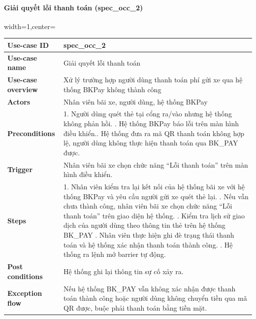 \paragraph{ Giải quyết lỗi thanh toán (spec\_occ\_2)}
\begin{adjustbox}{width=1\textwidth,center=\textwidth}
\small
\begin{tabular}{|>{\centering\arraybackslash}m{3.5cm}|m{13.2cm}|}
\hline
\textbf{Use-case ID} & spec\_occ\_2   \\ \hline
\textbf{Use-case name} & Giải quyết lỗi thanh toán   \\ \hline
\textbf{Use-case overview} & Xử lý trường hợp người dùng thanh toán phí gửi xe qua hệ thống BKPay không thành công   \\ \hline
\textbf{Actors} & Nhân viên bãi xe, người dùng, hệ thống BKPay  \\ \hline
\textbf{Preconditions} & 1. Người dùng quét thẻ tại cổng ra/vào nhưng hệ thống không phản hồi. \newline
2. Hệ thống BKPay báo lỗi trên màn hình điều khiển.\newline
3. Hệ thống đưa ra mã QR thanh toán không hợp lệ, người dùng không thực hiện thanh toán qua BK\_PAY được.\\ \hline
\textbf{Trigger} & Nhân viên bãi xe chọn chức năng “Lỗi thanh toán” trên màn hình điều khiển.   \\ \hline
\textbf{Steps} & 
1. Nhân viên kiểm tra lại kết nối của hệ thống bãi xe với hệ thống BKPay và yêu cầu người gửi xe quét thẻ lại. \newline
2. Nếu vẫn chưa thành công, nhân viên bãi xe chọn chức năng “Lỗi thanh toán” trên giao diện hệ thống. \newline
3. Kiểm tra lịch sử giao dịch của người dùng theo thông tin thẻ trên hệ thống BK\_PAY \newline
4. Nhân viên thực hiện ghi đè trạng thái thanh toán và hệ thống xác nhận thanh toán thành công. \newline
5. Hệ thống ra lệnh mở barrier tự động.   \\ \hline
\textbf{Post conditions} & Hệ thống ghi lại thông tin sự cố xảy ra. \\ \hline
\textbf{Exception flow} & Nếu hệ thống BK\_PAY vẫn không xác nhận được thanh toán thành công hoặc người dùng không chuyển tiền qua mã QR được, buộc phải thanh toán bằng tiền mặt. \\ \hline
\end{tabular}
\end{adjustbox}
